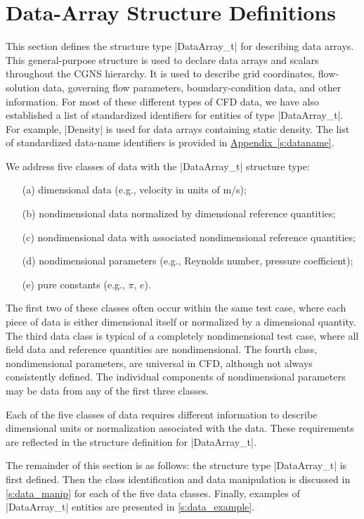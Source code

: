 \section{Data-Array Structure Definitions}
\label{s:data}
\thispagestyle{plain}

This section defines the structure type |DataArray_t| for describing
data arrays.  This general-purpose structure is used to declare
data arrays and scalars throughout the CGNS hierarchy.  It is used
to describe grid coordinates, flow-solution data, governing flow
parameters, boundary-condition data, and other information.  For most
of these different types of CFD data, we have also established a
list of standardized identifiers for entities of type |DataArray_t|.
For example, |Density| is used for data arrays containing static
density.  The list of standardized data-name identifiers is provided in
\hyperref[s:dataname]{Appendix~\ref*{s:dataname}}.

We address five classes of data with the |DataArray_t| structure type:
\begin{enumerate}
\item[(a)] dimensional data (e.g., velocity in units of m/s);
\item[(b)] nondimensional data normalized by dimensional reference
           quantities;
\item[(c)] nondimensional data with associated nondimensional reference
           quantities;
\item[(d)] nondimensional parameters (e.g., Reynolds number, pressure
           coefficient);
\item[(e)] pure constants (e.g., $\pi$, $e$).
\end{enumerate}
The first two of these classes often occur within the same test case,
where each piece of data is either dimensional itself or normalized by a
dimensional quantity.  The third data class is typical of a completely
nondimensional test case, where all field data and reference quantities
are nondimensional.  The fourth class, nondimensional parameters, are
universal in CFD, although not always consistently defined.  The
individual components of nondimensional parameters may be data from any
of the first three classes.

Each of the five classes of data requires different information to
describe dimensional units or normalization associated with the data.
These requirements are reflected in the structure definition for
|DataArray_t|.

The remainder of this section is as follows: the structure type
|DataArray_t| is first defined.  Then the class identification and data
manipulation is discussed in \autoref{s:data_manip} for each of the five data
classes.  Finally, examples of |DataArray_t| entities are presented in
\autoref{s:data_example}.

